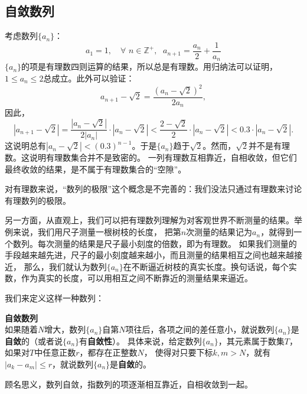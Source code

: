 \documentclass[12pt,UTF8,fontset=none]{ctexbook}
\begin{document}
\subsection{自敛数列}

考虑数列$\{a_n\}$：
$$ a_1 = 1, \quad \forall \,\, n \in \mathbb{Z}^+, \;\,\, a_{n+1} = \frac{a_n}{2} + \frac{1}{a_n} $$
$\{a_n\}$的项是有理数四则运算的结果，所以总是有理数。用归纳法可以证明，$1 \leqslant a_n \leqslant 2$总成立。此外可以验证：
$$ a_{n+1} - \sqrt{2} = \frac{(a_n - \sqrt{2})^2}{2a_n},$$
因此，
$$ |a_{n+1} - \sqrt{2}| = \frac{|a_n - \sqrt{2}|}{2|a_n|} \cdot |a_n - \sqrt{2}| < \frac{2 - \sqrt{2}}{2} \cdot |a_n - \sqrt{2}| < 0.3\cdot |a_n - \sqrt{2}|. $$
这说明总有$|a_n - \sqrt{2}| < (0.3)^{n-1}$。于是$\{a_n\}$趋于$\sqrt{2}$。然而，$\sqrt{2}$并不是有理数。这说明有理数集合并不是致密的。
一列有理数互相靠近，自相收敛，但它们最终收敛的结果，是不属于有理数集合的“空隙”。

对有理数来说，“数列的极限”这个概念是不完善的：我们没法只通过有理数来讨论有理数列的极限。

另一方面，从直观上，我们可以把有理数列理解为对客观世界不断测量的结果。举例来说，我们用尺子测量一根树枝的长度，
把第$n$次测量的结果记为$a_n$，就得到一个数列。每次测量的结果是尺子最小刻度的倍数，即为有理数。
如果我们测量的手段越来越先进，尺子的最小刻度越来越小，而且测量的结果相互之间也越来越接近，
那么，我们就认为数列$\{a_n\}$在不断逼近树枝的真实长度。换句话说，每个实数，作为真实的长度，可以用相互之间不断靠近的测量结果来逼近。

我们来定义这样一种数列：
\begin{df}\textbf{自敛数列}\\
    如果随着$N$增大，数列$\{a_n\}$自第$N$项往后，各项之间的差任意小，就说数列$\{a_n\}$是\textbf{自敛}的（或者说$\{a_n\}$有\textbf{自敛性}）。
    具体来说，给定数列$\{a_n\}$，其元素属于数集$T$，如果对$T$中任意正数$r$，都存在正整数$N$，
    使得对只要下标$k,m>N$，就有$|a_k - a_m| \leqslant r$，就说数列$\{a_n\}$是\textbf{自敛}的。
\end{df}

顾名思义，数列自敛，指数列的项逐渐相互靠近，自相收敛到一起。
\end{document}
